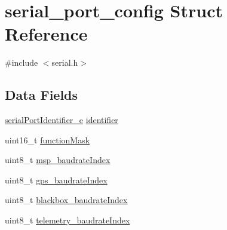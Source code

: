 \hypertarget{structserial__port__config}{\section{serial\+\_\+port\+\_\+config Struct Reference}
\label{structserial__port__config}
}


{\ttfamily \#include $<$serial.\+h$>$}

\subsection*{Data Fields}
\begin{DoxyCompactItemize}
\item 
\hyperlink{config_2serial_8h_a5aaf3d2a774f7a0335773299b8d78182}{serial\+Port\+Identifier\+\_\+e} \hyperlink{structserial__port__config_a09b560534b799b59e1a355bd17e05a47}{identifier}
\item 
uint16\+\_\+t \hyperlink{structserial__port__config_a3122c2e12ce2d6f68495003e9cd541c4}{function\+Mask}
\item 
uint8\+\_\+t \hyperlink{structserial__port__config_addc2400b5518f2fc7891f35e6cb324e4}{msp\+\_\+baudrate\+Index}
\item 
uint8\+\_\+t \hyperlink{structserial__port__config_a8a3c04e257c6b3314347e882ecc95ca5}{gps\+\_\+baudrate\+Index}
\item 
uint8\+\_\+t \hyperlink{structserial__port__config_a578754c41d338effc3da1339656a44a3}{blackbox\+\_\+baudrate\+Index}
\item 
uint8\+\_\+t \hyperlink{structserial__port__config_a4d5942832f483bb9dc069a11143e43f1}{telemetry\+\_\+baudrate\+Index}
\end{DoxyCompactItemize}


